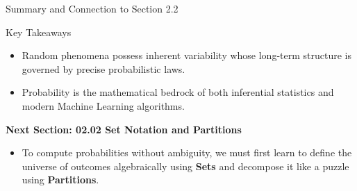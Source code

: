 \documentclass[10pt,aspectratio=169]{beamer}
\begin{document}
\begin{frame}{Summary and Connection to Section 2.2}
  \begin{block}{Key Takeaways}
    \begin{itemize}
      \item Random phenomena possess inherent variability whose long-term structure is governed by precise probabilistic laws. \pause
      \item Probability is the mathematical bedrock of both inferential statistics and modern Machine Learning algorithms.
    \end{itemize}
  \end{block}
  
  \vspace{0.8em}
  \pause
  {\large \color{TecAzulOscuro}\textbf{Next Section: 02.02 Set Notation and Partitions}}
  \vspace{0.3em}
  \begin{itemize}
    \item To compute probabilities without ambiguity, we must first learn to define the universe of outcomes algebraically using \textbf{Sets} and decompose it like a puzzle using \textbf{Partitions}.
  \end{itemize}
\end{frame}
\end{document}
